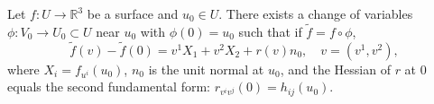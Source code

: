 Let $f: U \to \mathbb{R}^3$ be a surface and $u_0 \in U$. There exists a change of variables $\phi: V_0 \to U_0 \subset U$ near $u_0$ with $\phi(0) = u_0$ such that if $\tilde{f} = f \circ \phi$,
$$\tilde{f}(v) - \tilde{f}(0) = v^1 X_1 + v^2 X_2 + r(v)n_0, \quad v = (v^1, v^2),$$
where $X_i = f_{u^i}(u_0)$, $n_0$ is the unit normal at $u_0$, and the Hessian of $r$ at $0$ equals the second fundamental form: $r_{v^i v^j}(0) = h_{ij}(u_0)$.
